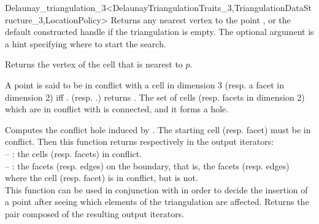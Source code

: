\begin{ccRefClass}{Delaunay_triangulation_3<DelaunayTriangulationTraits_3,TriangulationDataStructure_3,LocationPolicy>}
{Returns any nearest vertex to the point , or the default constructed
handle if the triangulation is empty.  The optional argument  is a hint
specifying where to start the search.
}

{Returns the  vertex  of the cell  that is
nearest to $p$.
}

A point  is said to be in conflict with a cell  in dimension 3
(resp. a facet  in dimension 2) iff \ccVar.
(resp. \ccVar.) returns .
The set of cells (resp. facets in dimension 2) which are in conflict with
 is connected, and it forms a hole.

{Computes the  conflict hole induced by .  The starting cell
(resp.  facet)  must be in conflict.  Then this function returns
respectively in the output iterators:\\
-- : the cells (resp. facets) in conflict.\\
-- : the facets (resp. edges) on the boundary, that is, the facets
(resp. edges)  where the cell (resp. facet)  is in
conflict, but  is not.\\
This function can be used in conjunction with  in order
to decide the insertion of a point after seeing which elements of the
triangulation are affected.
Returns the pair composed of the resulting output iterators.
}


\end{ccRefClass}
